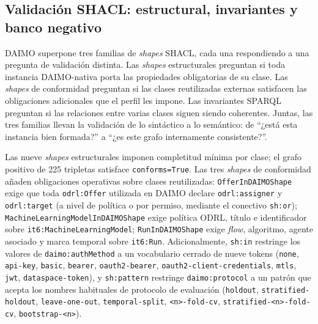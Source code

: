 \documentclass[11pt,a4paper]{article}
\newcommand{\code}[1]{\texttt{#1}}
\begin{document}
\subsection{Validación SHACL: estructural, invariantes y banco negativo}\label{sec:eval-shacl}

DAIMO superpone tres familias de \emph{shapes} SHACL, cada una respondiendo a una pregunta de validación distinta. Las \emph{shapes} estructurales preguntan si toda instancia DAIMO-nativa porta las propiedades obligatorias de su clase. Las \emph{shapes} de conformidad preguntan si las clases reutilizadas externas satisfacen las obligaciones adicionales que el perfil les impone. Las invariantes SPARQL preguntan si las relaciones entre varias clases siguen siendo coherentes. Juntas, las tres familias llevan la validación de lo sintáctico a lo semántico: de ``¿está esta instancia bien formada?'' a ``¿es este grafo internamente consistente?''.

Las nueve \emph{shapes} estructurales imponen completitud mínima por clase; el grafo positivo de 225 tripletas satisface \code{conforms=True}. Las tres \emph{shapes} de conformidad añaden obligaciones operativas sobre clases reutilizadas: \code{OfferInDAIMOShape} exige que toda \code{odrl:Offer} utilizada en DAIMO declare \code{odrl:assigner} y \code{odrl:target} (a nivel de política o por permiso, mediante el conectivo \code{sh:or}); \code{MachineLearningModelInDAIMOShape} exige política ODRL, título e identificador sobre \code{it6:MachineLearningModel}; \code{RunInDAIMOShape} exige \emph{flow}, algoritmo, agente asociado y marca temporal sobre \code{it6:Run}. Adicionalmente, \code{sh:in} restringe los valores de \code{daimo:authMethod} a un vocabulario cerrado de nueve tokens (\code{none}, \code{api-key}, \code{basic}, \code{bearer}, \code{oauth2-bearer}, \code{oauth2-client-credentials}, \code{mtls}, \code{jwt}, \code{dataspace-token}), y \code{sh:pattern} restringe \code{daimo:protocol} a un patrón que acepta los nombres habituales de protocolo de evaluación (\code{holdout}, \code{stratified-holdout}, \code{leave-one-out}, \code{temporal-split}, \code{<n>-fold-cv}, \code{stratified-<n>-fold-cv}, \code{bootstrap-<n>}).
\end{document}
